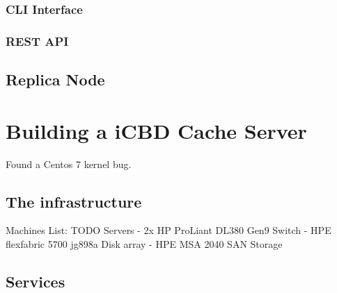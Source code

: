 \subsubsection{CLI Interface}
\label{subsub:rep_cli_interface}

\subsubsection{REST API}
\label{subsub:rep_restapi}

\subsection{Replica Node}
\label{sub:rep_replica_node}






\section{Building a iCBD Cache Server}
\label{sec:cache_server}

Found a Centos 7 kernel bug.


\subsection{The infrastructure}
\label{sub:infrastructure}

Machines List:
TODO
Servers - 2x HP ProLiant DL380 Gen9
Switch - HPE flexfabric 5700 jg898a
Disk array - HPE MSA 2040 SAN Storage

\subsection{Services}
\label{sub:cache_services}



